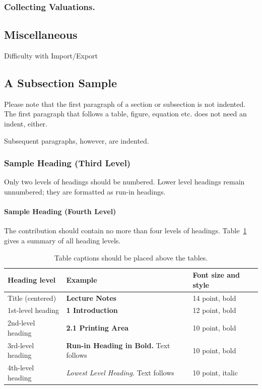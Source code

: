 \subsubsection{Collecting Valuations.}

\subsection{Miscellaneous}

Difficulty with Import/Export

\subsection{A Subsection Sample}
Please note that the first paragraph of a section or subsection is
not indented. The first paragraph that follows a table, figure,
equation etc. does not need an indent, either.

Subsequent paragraphs, however, are indented.

\subsubsection{Sample Heading (Third Level)} Only two levels of
headings should be numbered. Lower level headings remain unnumbered;
they are formatted as run-in headings.

\paragraph{Sample Heading (Fourth Level)}
The contribution should contain no more than four levels of
headings. Table~\ref{tab1} gives a summary of all heading levels.

\begin{table}
\caption{Table captions should be placed above the
tables.}\label{tab1}
\begin{tabular}{|l|l|l|}
\hline
Heading level &  Example & Font size and style\\
\hline
Title (centered) &  {\Large\bfseries Lecture Notes} & 14 point, bold\\
1st-level heading &  {\large\bfseries 1 Introduction} & 12 point, bold\\
2nd-level heading & {\bfseries 2.1 Printing Area} & 10 point, bold\\
3rd-level heading & {\bfseries Run-in Heading in Bold.} Text follows & 10 point, bold\\
4th-level heading & {\itshape Lowest Level Heading.} Text follows & 10 point, italic\\
\hline
\end{tabular}
\end{table}


